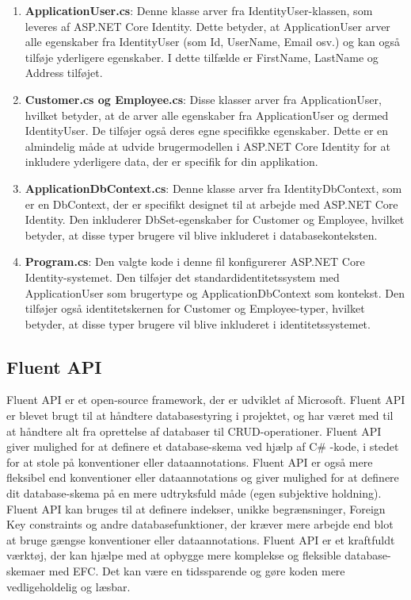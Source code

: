 \begin{enumerate}
    \item \textbf{ApplicationUser.cs}: Denne klasse arver fra IdentityUser-klassen, som leveres af ASP.NET Core Identity. Dette betyder, at ApplicationUser arver alle egenskaber fra IdentityUser (som Id, UserName, Email osv.) og kan også tilføje yderligere egenskaber. I dette tilfælde er FirstName, LastName og Address tilføjet.
    \item \textbf{Customer.cs og Employee.cs}: Disse klasser arver fra ApplicationUser, hvilket betyder, at de arver alle egenskaber fra ApplicationUser og dermed IdentityUser. De tilføjer også deres egne specifikke egenskaber. Dette er en almindelig måde at udvide brugermodellen i ASP.NET Core Identity for at inkludere yderligere data, der er specifik for din applikation.
    \item \textbf{ApplicationDbContext.cs}: Denne klasse arver fra IdentityDbContext, som er en DbContext, der er specifikt designet til at arbejde med ASP.NET Core Identity. Den inkluderer DbSet-egenskaber for Customer og Employee, hvilket betyder, at disse typer brugere vil blive inkluderet i databasekonteksten.
    \item \textbf{Program.cs}: Den valgte kode i denne fil konfigurerer ASP.NET Core Identity-systemet. Den tilføjer det standardidentitetssystem med ApplicationUser som brugertype og ApplicationDbContext som kontekst. Den tilføjer også identitetskernen for Customer og Employee-typer, hvilket betyder, at disse typer brugere vil blive inkluderet i identitetssystemet.
\end{enumerate}

\subsection{Fluent API}
Fluent API er et open-source framework, der er udviklet af Microsoft. Fluent API er blevet brugt til at håndtere databasestyring i projektet, og har været med til at håndtere alt fra oprettelse af databaser til CRUD-operationer.
Fluent API giver mulighed for at definere et database-skema ved hjælp af C\# -kode, i stedet for at stole på konventioner eller dataannotations.
Fluent API er også mere fleksibel end konventioner eller dataannotations og giver mulighed for at definere dit database-skema på en mere udtryksfuld måde (egen subjektive holdning). 
Fluent API kan bruges til at definere indekser, unikke begrænsninger, Foreign Key constraints og andre databasefunktioner, der kræver mere arbejde end blot at bruge gængse konventioner eller dataannotations.
Fluent API er et kraftfuldt værktøj, der kan hjælpe med at opbygge mere komplekse og fleksible database-skemaer med EFC. Det kan være en tidssparende og gøre koden mere vedligeholdelig og læsbar.


